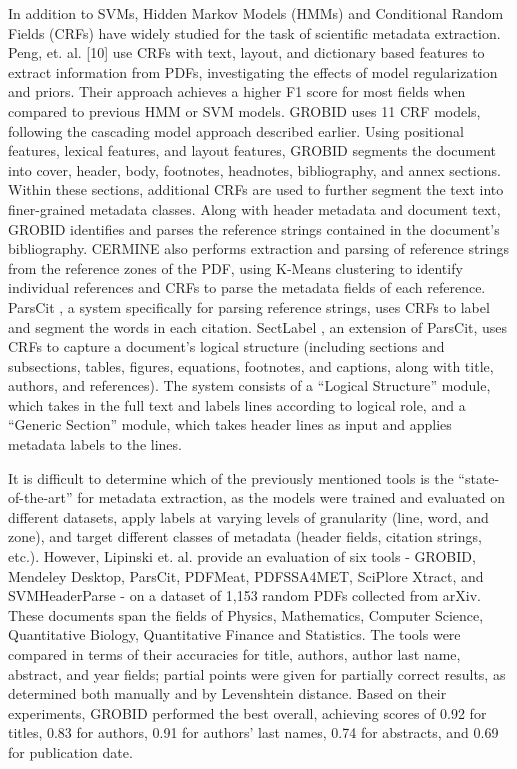 \documentclass{acm_proc_article-sp}
\begin{document}
In addition to SVMs, Hidden Markov Models (HMMs) and Conditional Random Fields (CRFs) have widely studied for the task of scientific metadata extraction. Peng, et. al. [10] use CRFs with text, layout, and dictionary based features to extract information from PDFs, investigating the effects of model regularization and priors. Their approach achieves a higher F1 score for most fields when compared to previous HMM or SVM models. GROBID \cite{lopez2009grobid} uses 11 CRF models, following the cascading model approach described earlier. Using positional features, lexical features, and layout features, GROBID segments the document into cover, header, body, footnotes, headnotes, bibliography, and annex sections. Within these sections, additional CRFs are used to further segment the text into finer-grained metadata classes. Along with header metadata and document text, GROBID identifies and parses the reference strings contained in the document’s bibliography. CERMINE also performs extraction and parsing of reference strings from the reference zones of the PDF, using K-Means clustering to identify individual references and CRFs to parse the metadata fields of each reference. ParsCit \cite{councill2008parscit}, a system specifically for parsing reference strings, uses CRFs to label and segment the words in each citation. SectLabel \cite{luong2012logical}, an extension of ParsCit, uses CRFs to capture a document’s logical structure (including sections and subsections, tables, figures, equations, footnotes, and captions, along with title, authors, and references). The system consists of a “Logical Structure” module, which takes in the full text and labels lines according to logical role, and a “Generic Section” module, which takes header lines as input and applies metadata labels to the lines. 

It is difficult to determine which of the previously mentioned tools is the “state-of-the-art” for metadata extraction, as the models were trained and evaluated on different datasets, apply labels at varying levels of granularity (line, word, and zone), and target different classes of metadata (header fields, citation strings, etc.). However, Lipinski et. al. \cite{lipinski2013evaluation} provide an evaluation of six tools - GROBID, Mendeley Desktop, ParsCit, PDFMeat, PDFSSA4MET, SciPlore Xtract, and SVMHeaderParse - on a dataset of 1,153 random PDFs collected from arXiv. These documents span the fields of Physics, Mathematics, Computer Science, Quantitative Biology, Quantitative Finance and Statistics. The tools were compared in terms of their accuracies for title, authors, author last name, abstract, and year fields; partial points were given for partially correct results, as determined both manually and by Levenshtein distance. Based on their experiments, GROBID performed the best overall, achieving scores of 0.92 for titles, 0.83 for authors, 0.91 for authors’ last names, 0.74 for abstracts, and 0.69 for publication date.
\end{document}
